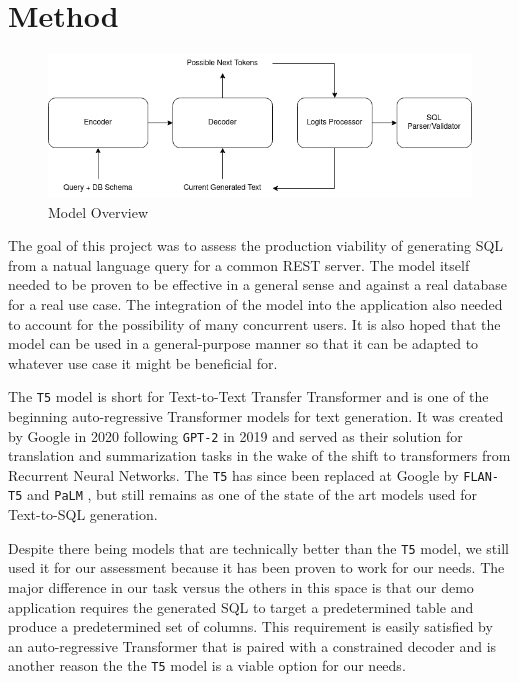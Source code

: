 \documentclass[11pt]{article}
\begin{document}
\section{Method}

\begin{figure}
\centering
\includegraphics[width=\textwidth]{t5-transformer.drawio.png}
\caption{\label{fig:model} Model Overview}
\end{figure}

The goal of this project was to assess the production viability of generating SQL from a natual language query for a common REST server. The model itself needed to be proven to be effective in a general sense and against a real database for a real use case. The integration of the model into the application also needed to account for the possibility of many concurrent users. It is also hoped that the model can be used in a general-purpose manner so that it can be adapted to whatever use case it might be beneficial for.

The \texttt{T5} model \citep{raffel2020exploring} is short for Text-to-Text Transfer Transformer and is one of the beginning auto-regressive Transformer models for text generation. It was created by Google in 2020 following \texttt{GPT-2} in 2019 \citep{radfordgpt2} and served as their solution for translation and summarization tasks in the wake of the shift to transformers from Recurrent Neural Networks. The \texttt{T5} has since been replaced at Google by \texttt{FLAN-T5} \citep{chung2022scaling} and \texttt{PaLM} \citep{chowdhery2022palm}, but still remains as one of the state of the art models used for Text-to-SQL generation.

Despite there being models that are technically better than the \texttt{T5} model, we still used it for our assessment because it has been proven to work for our needs. The major difference in our task versus the others in this space is that our demo application requires the generated SQL to target a predetermined table and produce a predetermined set of columns. This requirement is easily satisfied by an auto-regressive Transformer that is paired with a constrained decoder and is another reason the the \texttt{T5} model is a viable option for our needs.
\end{document}
